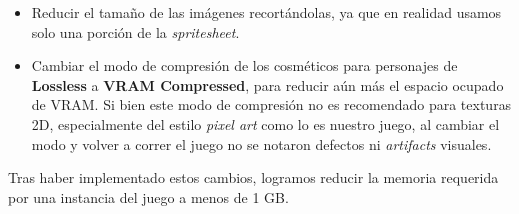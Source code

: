 \begin{itemize}
    \item Reducir el tamaño de las imágenes recortándolas, ya que en realidad usamos solo
    una porción de la \textit{spritesheet}.
    \item Cambiar el modo de compresión de los cosméticos para personajes de \textbf{Lossless}
    a \textbf{VRAM Compressed}, para reducir aún más el espacio ocupado de VRAM. Si bien este
    modo de compresión no es recomendado para texturas 2D, especialmente del estilo
    \textit{pixel art} como lo es nuestro juego, al cambiar el modo y volver a correr el juego
    no se notaron defectos ni \textit{artifacts} visuales.
\end{itemize}

Tras haber implementado estos cambios, logramos reducir la memoria requerida por una instancia
del juego a menos de 1 GB.

